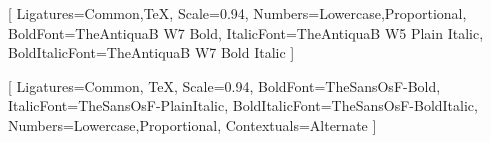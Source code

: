%



\setmainfont{TheAntiquaB W5 Plain}[
    Ligatures={Common,TeX},
    Scale=0.94, %
    Numbers={Lowercase,Proportional},
    BoldFont=TheAntiquaB W7 Bold,
    ItalicFont=TheAntiquaB W5 Plain Italic,
    BoldItalicFont=TheAntiquaB W7 Bold Italic
]

\setsansfont{TheSansOsF-Plain}[
    Ligatures={Common, TeX},
    Scale=0.94,
    BoldFont=TheSansOsF-Bold,
    ItalicFont=TheSansOsF-PlainItalic,
    BoldItalicFont=TheSansOsF-BoldItalic,
    Numbers={Lowercase,Proportional},
    Contextuals={Alternate}
]

